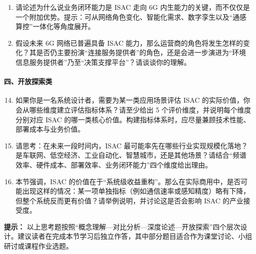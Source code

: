 \begin{enumerate}
    \item 请论述为什么说业务闭环能力是 ISAC 走向 6G 内生能力的关键，而不仅仅是一个附加优势。提示：可从网络角色变化、智能化需求、数字孪生以及“通感算控”一体化等角度展开。

    \item 假设未来 6G 网络已普遍具备 ISAC 能力，那么运营商的角色将发生怎样的变化？其是否仍主要扮演“连接服务提供者”的角色，还是会进一步演进为“环境信息服务提供者”乃至“决策支撑平台”？请谈谈你的理解。
\end{enumerate}

\paragraph{四、开放探索类}
\begin{enumerate}
    \setcounter{enumi}{13}
    \item 如果你是一名系统设计者，需要为某一类应用场景评估 ISAC 的实际价值，你会从哪些维度建立评估指标体系？请至少给出 5 个评价维度，并说明每个维度分别对应 ISAC 的哪一类核心价值。构建指标体系时，应尽量兼顾技术性能、部署成本与业务价值。

    \item 请思考：在未来一段时间内，ISAC 最可能率先在哪些行业实现规模化落地？是车联网、低空经济、工业自动化、智慧城市，还是其他场景？请结合“频谱效率、硬件成本、部署效率、业务闭环能力”四个维度给出理由。

    \item 本节强调，ISAC 的价值在于“系统级收益重构”。那么在实际商用中，是否可能出现这样的情况：某一项单独指标（例如通信速率或感知精度）略有下降，但整个系统反而更有价值？请举例说明，并讨论这是否会影响 ISAC 的产业接受度。
\end{enumerate}

\noindent\textbf{提示：} 以上思考题按照“概念理解—对比分析—深度论述—开放探索”四个层次设计。建议读者在完成本节学习后独立作答，其中部分题目适合作为课堂讨论、小组研讨或课程作业选题。